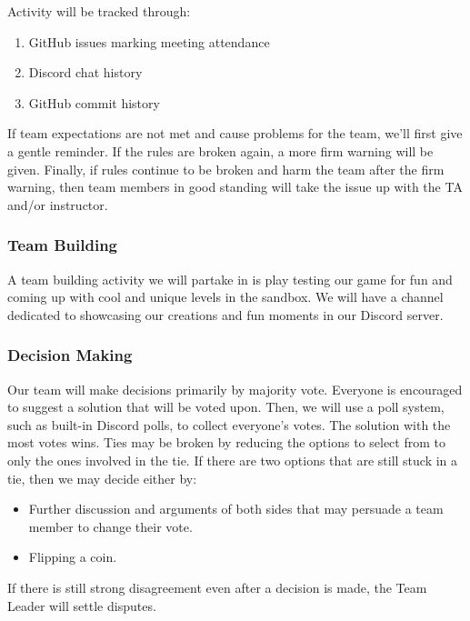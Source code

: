 \documentclass{article}
\begin{document}
Activity will be tracked through:
\begin{enumerate}
\item{GitHub issues marking meeting attendance}
\item{Discord chat history}
\item{GitHub commit history}
\end{enumerate}

If team expectations are not met and cause problems for the team, we'll first give a gentle reminder. If the rules are broken again, a more firm warning will be given. Finally, if rules continue to be broken and harm the team after the firm warning, then team members in good standing will take the issue up with the TA and/or instructor.


\subsubsection*{Team Building}

A team building activity we will partake in is play testing our game for fun and coming up with cool and unique levels in the sandbox. We will have a channel dedicated to showcasing our creations and fun moments in our Discord server.

\subsubsection*{Decision Making} 

Our team will make decisions primarily by majority vote. Everyone is encouraged to suggest a solution that will be voted upon. Then, we will use a poll system, such as built-in Discord polls, to collect everyone's votes. The solution with the most votes wins.
Ties may be broken by reducing the options to select from to only the ones involved in the tie. If there are two options that are still stuck in a tie, then we may decide either by:
\begin{itemize}
\item{Further discussion and arguments of both sides that may persuade a team member to change their vote.}
\item{Flipping a coin.}
\end{itemize}
If there is still strong disagreement even after a decision is made, the Team Leader will settle disputes.
\end{document}

